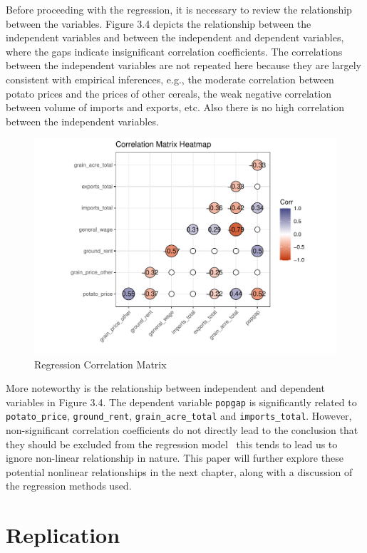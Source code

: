 Before proceeding with the regression, it is necessary to review the relationship between the variables. Figure 3.4 depicts the relationship between the independent variables and between the independent and dependent variables, where the gaps indicate insignificant correlation coefficients. The correlations between the independent variables are not repeated here because they are largely consistent with empirical inferences, e.g., the moderate correlation between potato prices and the prices of other cereals, the weak negative correlation between volume of imports and exports, etc. Also there is no high correlation between the independent variables.

\begin{figure}[htbp]
    \centering
    \caption{Regression Correlation Matrix}
    \includegraphics[width=.95\textwidth]{../03_outputs/corrmatrix.pdf}
\end{figure}

More noteworthy is the relationship between independent and dependent variables in Figure 3.4. The dependent variable \texttt{popgap} is significantly related  to \texttt{potato\_price}, \texttt{ground\_rent}, \texttt{grain\_acre\_total} and \texttt{imports\_total}. However, non-significant correlation coefficients do not directly lead to the conclusion that they should be excluded from the regression model \textemdash\ this tends to lead us to ignore non-linear relationship in nature. This paper will further explore these potential nonlinear relationships in the next chapter, along with a discussion of the regression methods used.

\section{Replication}

